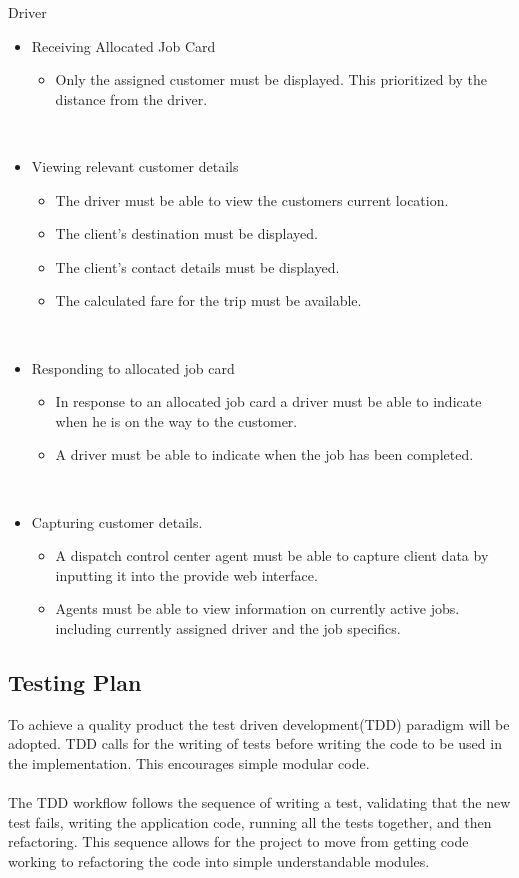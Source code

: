 \documentclass[10pt,twocolumn]{witseiepaper}
\begin{document}
Driver
\begin{itemize} 
\item Receiving Allocated Job Card
\begin{itemize}
\item Only the assigned customer must be displayed. This prioritized by the distance from the driver.
\end{itemize}\

\item Viewing relevant customer details
\begin{itemize}
\item The driver must be able to view the customers current location.
\item The client's destination must be displayed.
\item The client's contact details must be displayed.
\item The calculated fare for the trip must be available.
\end{itemize}\

\item  Responding to allocated job card
\begin{itemize}
\item In response to an allocated job card a driver must be able to indicate when he is on the way to the customer.
\item A driver must be able to indicate when the job has been completed.
\end{itemize}\

\item Capturing customer details.
\begin{itemize}
\item A dispatch control center agent must be able to capture client data by inputting it into the provide web interface.
\item Agents must be able to view information on currently active jobs. including currently assigned driver and the job specifics.
\end{itemize}
\end{itemize}

\subsection{Testing Plan}

To achieve a quality product the test driven development(TDD) paradigm will be adopted. TDD calls for the writing of tests before writing the code to be used in the implementation. This encourages simple modular code.\\\\
 The TDD workflow follows the sequence of writing a test, validating that the new test fails, writing the application code, running all the tests together, and then refactoring. This sequence allows for the project to move from getting code working to refactoring the code into simple understandable modules.
\end{document}
